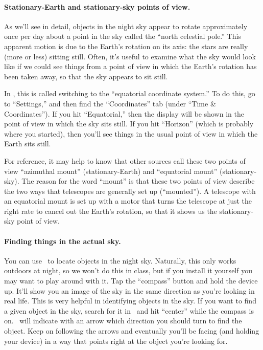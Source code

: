 \paragraph{Stationary-Earth and stationary-sky points of view.}
As we'll see in detail, objects in the night sky appear to rotate
approximately once per day about a point in the sky called the ``north
celestial pole.'' This apparent motion is due to the 
Earth's rotation on its axis: the stars are really (more or less)
sitting still. 
Often, it's useful to examine what the sky would look like if
we could see things from a point of view in which 
the Earth's rotation has been taken away, so that the sky appears
to sit still. 

In \skysaf, this is called switching to the ``equatorial coordinate system.''
To do this, go to ``Settings,'' and then find the ``Coordinates''
tab (under ``Time \& Coordinates''). If you hit ``Equatorial,''
then the display will be shown in the point of view in which the sky sits
still. If you hit ``Horizon'' (which is probably where you started),
then you'll see things in the usual point of view in which the Earth
sits still.

For reference, it may help to know that other sources call
these two points of view ``azimuthal mount'' (stationary-Earth)
and ``equatorial mount'' (stationary-sky). The reason for the word
``mount'' is that these two points of view describe the two
ways that telescopes are generally set up (``mounted''). A
telescope with an equatorial mount is set up with a motor that turns
the telescope at just the right rate to cancel out the Earth's
rotation, so that it shows us the stationary-sky point of view.

\paragraph{Finding things in the actual sky.}
You can use \skysaf\ to locate objects in the night sky. Naturally,
this only works outdoors at night, so we won't do this in class, but if you
install it yourself you may want to play around with it. Tap the
``compass'' button and hold the device up. It'll show you
an image of the sky in the
same direction as you're looking in real life. This is very helpful
in identifying objects in the sky. If you want to find a given
object in the sky, search for it in \skysaf\ and hit ``center'' while
the compass is on. \skysaf\ will indicate with an arrow which direction 
you should turn to find the object. Keep on following the arrows
and eventually you'll be facing (and holding your device) in a way
that points right at the object you're looking for.
